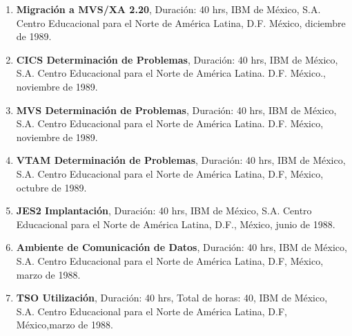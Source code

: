 \begin{enumerate}
\item \textbf{Migración a MVS/XA 2.20}, Duración: 40 hrs, IBM de México, S.A. Centro Educacional para el Norte de América Latina, D.F. 
México, diciembre de 
1989.

\item \textbf{CICS Determinación de Problemas}, Duración: 40 hrs, IBM de México, S.A. Centro Educacional para el Norte de América Latina. 
D.F. México., 
noviembre de 1989.

\item \textbf{MVS Determinación de Problemas}, Duración: 40 hrs, IBM de México, S.A. Centro Educacional para el Norte de América Latina. D.F. 
México, 
noviembre de 1989.

\item \textbf{VTAM Determinación de Problemas}, Duración: 40 hrs, IBM de México, S.A. Centro Educacional para el Norte de América Latina, 
D.F, México, 
octubre de 1989.

\item \textbf{JES2 Implantación}, Duración: 40 hrs, IBM de México, S.A. Centro Educacional para el Norte de América Latina, D.F., México, 
junio de 1988.

\item \textbf{Ambiente de Comunicación de Datos}, Duración: 40 hrs, IBM de México, S.A. Centro Educacional para el Norte de América Latina, 
D.F, México, 
marzo de 1988.

\item \textbf{TSO Utilización}, Duración: 40 hrs, Total de horas: 40, IBM de México, S.A. Centro Educacional para el Norte de América Latina, 
D.F, 
México,marzo de 1988.
\end{enumerate}

